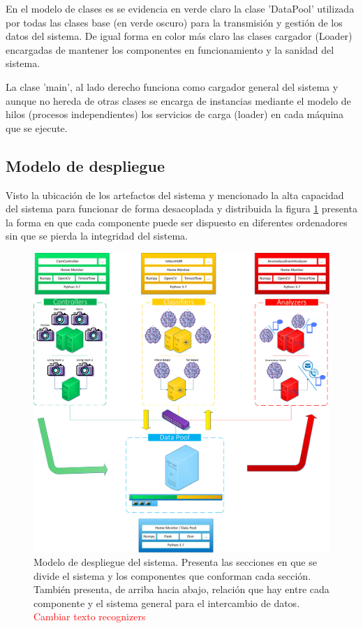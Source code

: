         En el modelo de clases es se evidencia en verde claro la clase 'DataPool' utilizada por todas las clases base (en verde oscuro) para la transmisión y gestión de los datos del sistema. De igual forma en color más claro las clases cargador (Loader) encargadas de mantener los componentes en funcionamiento y la sanidad del sistema.
        
        La clase 'main', al lado derecho funciona como cargador general del sistema y aunque no hereda de otras clases se encarga de instancias mediante el modelo de hilos (procesos independientes) los servicios de carga (loader) en cada máquina que se ejecute. 
        
    \subsection{Modelo de despliegue}
    \label{sub:DeployModel}
        Visto la ubicación de los artefactos del sistema y mencionado la alta capacidad del sistema para funcionar de forma desacoplada y distribuida la figura \ref{fig:PhysicModel} presenta la forma en que cada componente puede ser dispuesto en diferentes ordenadores sin que se pierda la integridad del sistema.
    
        \begin{figure}[ht!]
        	\centering
        	\includegraphics[width=0.9\linewidth]{imgs/03-Architecture/03-PhysicModel.png}
        	\caption[Modelo de despliegue del sistema]{Modelo de despliegue del sistema. Presenta las secciones en que se divide el sistema y los componentes que conforman cada sección. También presenta, de arriba hacia abajo, relación que hay entre cada componente y el sistema general para el intercambio de datos. \textcolor{red}{Cambiar texto recognizers}}
    	    \label{fig:PhysicModel}
        \end{figure}%
    
